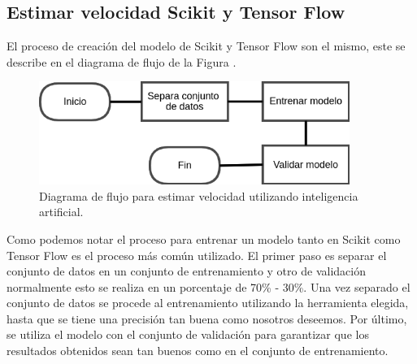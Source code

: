 \subsection{Estimar velocidad Scikit y Tensor Flow}

El proceso de creación del modelo de Scikit y Tensor Flow son el mismo, este se describe en el diagrama de flujo de la Figura \label{ref:ModeloScikitTensorFlow}.


\begin{figure}[H]
    \centering
    \includegraphics[width=0.9\textwidth]{Metodologia/imgs/ModeloScikitTensorFlow.png}
    \caption{Diagrama de flujo para estimar velocidad utilizando inteligencia artificial.}
    \label{fig:ModeloScikitTensorFlow}
\end{figure}


Como podemos notar el proceso para entrenar un modelo tanto en Scikit como Tensor Flow es el proceso más común utilizado. El primer paso es separar el conjunto de datos en un conjunto de entrenamiento y otro de validación normalmente esto se realiza en un porcentaje de 70\% - 30\%. Una vez separado el conjunto de datos se procede al entrenamiento utilizando la herramienta elegida, hasta que se tiene una precisión tan buena como nosotros deseemos. Por último, se utiliza el modelo con el conjunto de validación para garantizar que los resultados obtenidos sean tan buenos como en el conjunto de entrenamiento.

